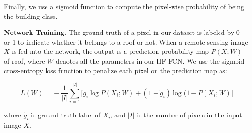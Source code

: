 Finally, we use a sigmoid function to compute the pixel-wise probability of being the building class.



\noindent\textbf{Network Training.} 
The ground truth of a pixel in our dataset is labeled by 0 or 1 to indicate whether it belongs to a roof or not.  
When a remote sensing image ${X}$ is fed into the network, the output is a prediction probability map $P(X;W)$ of roof, where $W$ denotes all the parameters in our HF-FCN.
We use the sigmoid cross-entropy loss function to penalize each pixel on the prediction map as:
\begin{small}
\begin{equation}
     \label{loss}
     \ L(W)\! =\! -\frac{1}{\vert I\vert}\sum_{i=1}^{\vert I \vert}\lbrack{\tilde{g}_i \log{P(X_{i};W)}\!+\!(1\!-\!\tilde{g}_i)\log(1\!-\!P(X_{i};W)}\rbrack
\end{equation}
\end{small}
where $\tilde{g}_i$ is ground-truth label of $X_{i}$, and ${\vert I\vert}$ is the number of pixels in the input image ${X}$.
